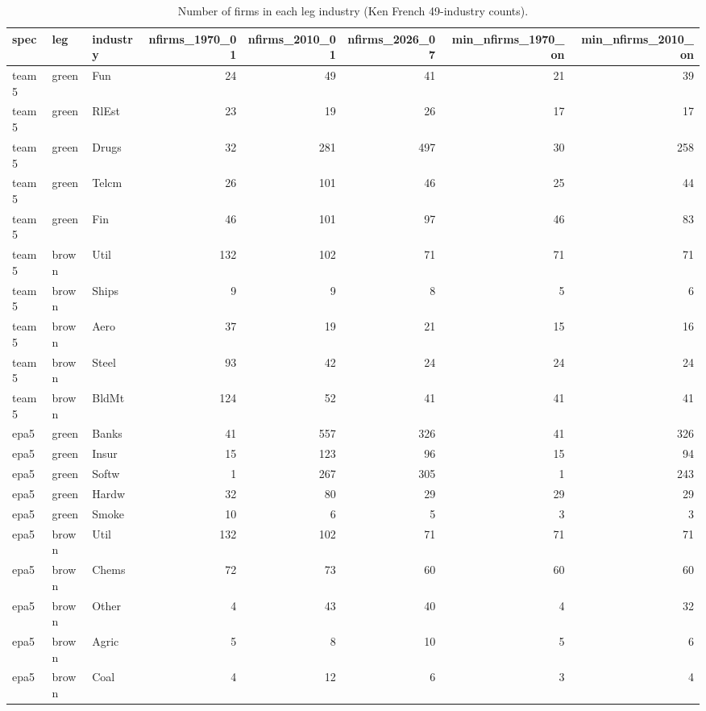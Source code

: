\begin{table}
\caption{Number of firms in each leg industry (Ken French 49-industry counts).}
\label{tab:m4_breadth}
\begin{tabular}{lllrrrrr}
\toprule
spec & leg & industry & nfirms\_1970\_01 & nfirms\_2010\_01 & nfirms\_2026\_07 & min\_nfirms\_1970\_on & min\_nfirms\_2010\_on \\
\midrule
team5 & green & Fun & 24 & 49 & 41 & 21 & 39 \\
team5 & green & RlEst & 23 & 19 & 26 & 17 & 17 \\
team5 & green & Drugs & 32 & 281 & 497 & 30 & 258 \\
team5 & green & Telcm & 26 & 101 & 46 & 25 & 44 \\
team5 & green & Fin & 46 & 101 & 97 & 46 & 83 \\
team5 & brown & Util & 132 & 102 & 71 & 71 & 71 \\
team5 & brown & Ships & 9 & 9 & 8 & 5 & 6 \\
team5 & brown & Aero & 37 & 19 & 21 & 15 & 16 \\
team5 & brown & Steel & 93 & 42 & 24 & 24 & 24 \\
team5 & brown & BldMt & 124 & 52 & 41 & 41 & 41 \\
epa5 & green & Banks & 41 & 557 & 326 & 41 & 326 \\
epa5 & green & Insur & 15 & 123 & 96 & 15 & 94 \\
epa5 & green & Softw & 1 & 267 & 305 & 1 & 243 \\
epa5 & green & Hardw & 32 & 80 & 29 & 29 & 29 \\
epa5 & green & Smoke & 10 & 6 & 5 & 3 & 3 \\
epa5 & brown & Util & 132 & 102 & 71 & 71 & 71 \\
epa5 & brown & Chems & 72 & 73 & 60 & 60 & 60 \\
epa5 & brown & Other & 4 & 43 & 40 & 4 & 32 \\
epa5 & brown & Agric & 5 & 8 & 10 & 5 & 6 \\
epa5 & brown & Coal & 4 & 12 & 6 & 3 & 4 \\
\bottomrule
\end{tabular}
\end{table}
